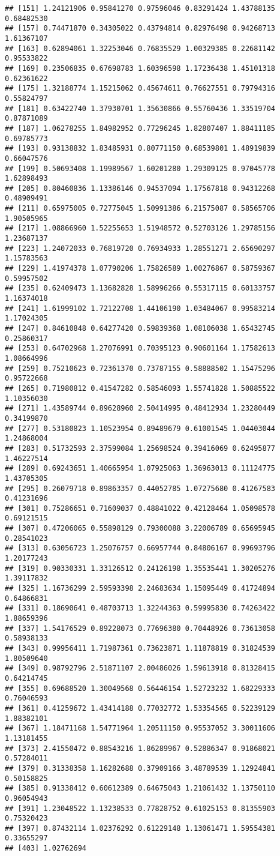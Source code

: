 \documentclass[
]{article}
\begin{document}
\begin{verbatim}
## [151] 1.24121906 0.95841270 0.97596046 0.83291424 1.43788135 0.68482530
## [157] 0.74471870 0.34305022 0.43794814 0.82976498 0.94268713 1.61367107
## [163] 0.62894061 1.32253046 0.76835529 1.00329385 0.22681142 0.95533822
## [169] 0.23506835 0.67698783 1.60396598 1.17236438 1.45101318 0.62361622
## [175] 1.32188774 1.15215062 0.45674611 0.76627551 0.79794316 0.55824797
## [181] 0.63422740 1.37930701 1.35630866 0.55760436 1.33519704 0.87871089
## [187] 1.06278255 1.84982952 0.77296245 1.82807407 1.88411185 0.69785773
## [193] 0.93138832 1.83485931 0.80771150 0.68539801 1.48919839 0.66047576
## [199] 0.50693408 1.19989567 1.60201280 1.29309125 0.97045778 1.62898493
## [205] 0.80460836 1.13386146 0.94537094 1.17567818 0.94312268 0.48909491
## [211] 0.65975005 0.72775045 1.50991386 6.21575087 0.58565706 1.90505965
## [217] 1.08866960 1.52255653 1.51948572 0.52703126 1.29785156 1.23687137
## [223] 1.24072033 0.76819720 0.76934933 1.28551271 2.65690297 1.15783563
## [229] 1.41974378 1.07790206 1.75826589 1.00276867 0.58759367 0.59957502
## [235] 0.62409473 1.13682828 1.58996266 0.55317115 0.60133757 1.16374018
## [241] 1.61999102 1.72122708 1.44106190 1.03484067 0.99583214 1.17024305
## [247] 0.84610848 0.64277420 0.59839368 1.08106038 1.65432745 0.25860317
## [253] 0.64702968 1.27076991 0.70395123 0.90601164 1.17582613 1.08664996
## [259] 0.75210623 0.72361370 0.73787155 0.58888502 1.15475296 0.95722668
## [265] 0.71980812 0.41547282 0.58546093 1.55741828 1.50885522 1.10356030
## [271] 1.43589744 0.89628960 2.50414995 0.48412934 1.23280449 0.34199870
## [277] 0.53180823 1.10523954 0.89489679 0.61001545 1.04403044 1.24868004
## [283] 0.51732593 2.37599084 1.25698524 0.39416069 0.62495877 1.46227514
## [289] 0.69243651 1.40665954 1.07925063 1.36963013 0.11124775 1.43705305
## [295] 0.26079718 0.89863357 0.44052785 1.07275680 0.41267583 0.41231696
## [301] 0.75286651 0.71609037 0.48841022 0.42128464 1.05098578 0.69121515
## [307] 0.47206065 0.55898129 0.79300088 3.22006789 0.65695945 0.28541023
## [313] 0.63056723 1.25076757 0.66957744 0.84806167 0.99693796 1.20177243
## [319] 0.90330331 1.33126512 0.24126198 1.35535441 1.30205276 1.39117832
## [325] 1.16736299 2.59593398 2.24683634 1.15095449 0.41724894 0.64866831
## [331] 0.18690641 0.48703713 1.32244363 0.59995830 0.74263422 1.88659396
## [337] 1.54176529 0.89228073 0.77696380 0.70448926 0.73613058 0.58938133
## [343] 0.99956411 1.71987361 0.73623871 1.11878819 0.31824539 1.80509640
## [349] 0.98792796 2.51871107 2.00486026 1.59613918 0.81328415 0.64214745
## [355] 0.69688520 1.30049568 0.56446154 1.52723232 1.68229333 0.76046593
## [361] 0.41259672 1.43414188 0.77032772 1.53354565 0.52239129 1.88382101
## [367] 1.18471168 1.54771964 1.20511150 0.95537052 3.30011606 1.13181455
## [373] 2.41550472 0.88543216 1.86289967 0.52886347 0.91868021 0.57284011
## [379] 0.31338358 1.16282688 0.37909166 3.48789539 1.12924841 0.50158825
## [385] 0.91338412 0.60612389 0.64675043 1.21061432 1.13750110 0.96054943
## [391] 1.23048522 1.13238533 0.77828752 0.61025153 0.81355903 0.75320423
## [397] 0.87432114 1.02376292 0.61229148 1.13061471 1.59554381 0.33655297
## [403] 1.02762694
\end{verbatim}
\end{document}
